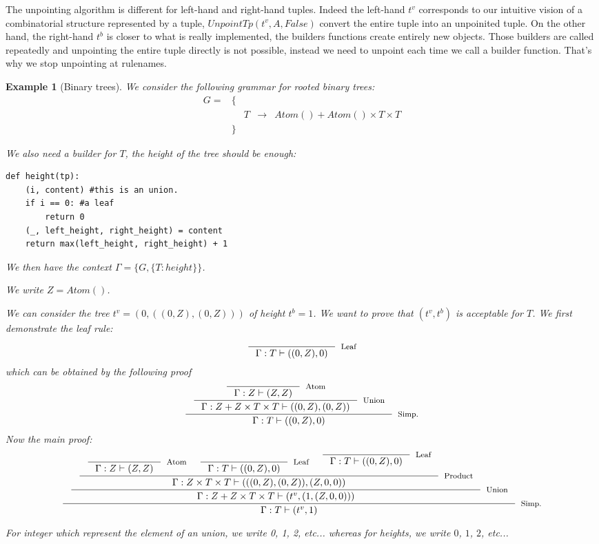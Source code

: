 \documentclass{article}
\newtheorem{example}{Example}
\begin{document}
The unpointing algorithm is different for left-hand and right-hand tuples. Indeed the left-hand $t^v$ corresponds to our intuitive vision of a combinatorial structure represented by a tuple, $UnpointTp(t^v, A, False)$ convert the entire tuple into an unpoinited tuple. On the other hand, the right-hand $t^b$ is closer to what is really implemented, the builders functions create entirely new objects. Those builders are called repeatedly and unpointing the entire tuple directly is not possible, instead we need to unpoint each time we call a builder function. That's why we stop unpointing at rulenames.

\begin{example}[Binary trees]
We consider the following grammar for rooted binary trees:
\begin{align*}
G = &\{&\\
&&T &\rightarrow& Atom() + Atom() \times T \times T\\
&\}&
\end{align*}

We also need a builder for $T$, the height of the tree should be enough:
\begin{lstlisting}
def height(tp):
	(i, content) #this is an union.
	if i == 0: #a leaf
		return 0
	(_, left_height, right_height) = content
	return max(left_height, right_height) + 1
\end{lstlisting}

We then have the context $\Gamma = \{G, \{T: height\}\}$. 

We write $Z = Atom()$.

We can consider the tree $t^v = (\text{0}, ((\text{0}, Z), (\text{0}, Z)))$ of height $t^b = 1$. We want to prove that $(t^v, t^b)$ is acceptable for $T$. We first demonstrate the leaf rule:
$$\inference{}{\Gamma: T\vdash ((\text{0}, Z), 0)}[Leaf]$$
which can be obtained by the following proof
$$\inference{\inference{\inference{}{\Gamma :Z\vdash (Z, Z)}[Atom]}{\Gamma: Z + Z \times T \times T \vdash ((\text{0}, Z), (\text{0}, Z))}[Union]}{\Gamma: T \vdash ((\text{0}, Z), 0)}[Simp.]$$
Now the main proof:
$$\inference{\inference{\inference{\inference{}{
\Gamma :Z\vdash (Z, Z)}[Atom] \quad
\inference{}{\Gamma: T\vdash ((\text{0}, Z), 0)}[Leaf] \quad
\inference{}{\Gamma: T\vdash ((\text{0}, Z), 0)}[Leaf]}
{\Gamma: Z\times T \times T\vdash (((\text{0}, Z), (\text{0} ,Z)), (Z, 0, 0))}[Product]}{\Gamma: Z + Z \times T \times T\vdash (t^v, (\text{1}, (Z, 0, 0)))}[Union]}{\Gamma: T \vdash (t^v, 1)}[Simp.]$$

For integer which represent the element of an union, we write 0, 1, 2, etc... whereas for heights, we write $0$, $1$, $2$, etc...

\end{example}
\end{document}
